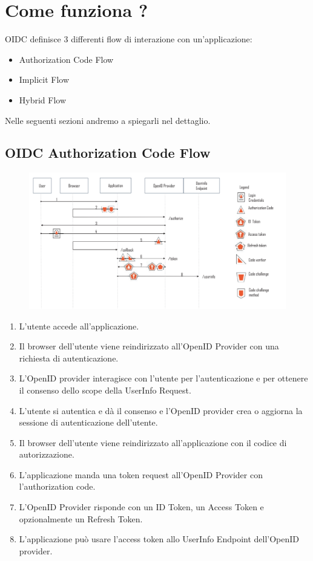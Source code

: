\section{Come funziona ?}

OIDC definisce 3 differenti flow di interazione con un'applicazione:

\begin{itemize}
      \item Authorization Code Flow
      \item Implicit Flow
      \item Hybrid Flow
\end{itemize}

Nelle seguenti sezioni andremo a spiegarli nel dettaglio.

\subsection{OIDC Authorization Code Flow}

\begin{figure}[H]
      \centering
      \includegraphics[width=\textwidth, keepaspectratio]{capitoli/id_managing/imgs/codeflow.png}
\end{figure}

\begin{enumerate}
      \item L'utente accede all'applicazione.
      \item Il browser dell'utente viene reindirizzato all'OpenID Provider con una
            richiesta di autenticazione.
      \item L'OpenID provider interagisce con l'utente per l'autenticazione e per
            ottenere il consenso dello scope della UserInfo Request.
      \item L'utente si autentica e dà il consenso e l'OpenID provider crea o aggiorna
            la sessione di autenticazione dell'utente.
      \item  Il browser dell'utente viene reindirizzato all'applicazione con il codice
            di autorizzazione.
      \item L'applicazione manda una token request all'OpenID Provider con
            l'authorization code.
      \item L'OpenID Provider risponde con un ID Token, un Access Token e opzionalmente
            un Refresh Token.
      \item L'applicazione può usare l'access token allo UserInfo Endpoint dell'OpenID
            provider.
\end{enumerate}

